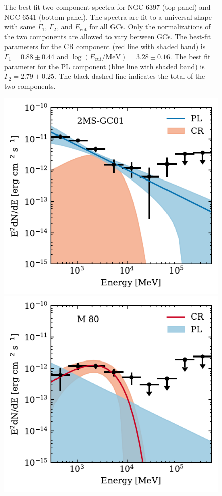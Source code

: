 \documentclass[doublespace,draft,nopageskip]{VTthesis} %
\begin{document}
\begin{figure}
    \caption{The best-fit two-component spectra for NGC 6397 (top panel) and NGC 6541 (bottom panel). The spectra are fit to a universal shape with same $\Gamma_1$, $\Gamma_2$, and $E_\mathrm{cut}$ for all GCs.  Only the normalizations of the two components are allowed to vary between GCs. The best-fit parameters for the CR component (red line with shaded band) is $\Gamma_1 = 0.88 \pm 0.44$ and $\log(E_\mathrm{cut}/\mathrm{MeV})=3.28 \pm 0.16$. The best fit parameter for the {PL} component (blue line with shaded band) is $\Gamma_2 = 2.79 \pm 0.25$. The black dashed line indicates the total of the two components.}
    \label{fig:global_spectra}
\end{figure}

\begin{figure}
    \centering
    \includegraphics[width=1\columnwidth]{Figures/Globular/spectra/2comp_0.pdf}
    \includegraphics[width=1\columnwidth]{Figures/Globular/spectra/2comp_8.pdf}

\end{figure}
\end{document}
